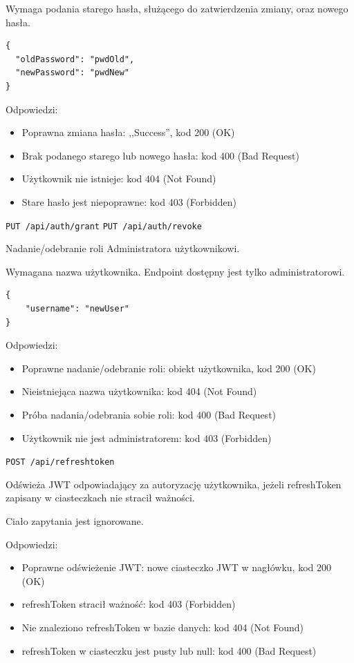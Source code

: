 \documentclass[a4paper,twoside,12pt]{book}
\begin{document}
Wymaga podania starego hasła, służącego do zatwierdzenia zmiany, oraz nowego hasła.

\begin{verbatim}
{
  "oldPassword": "pwdOld",
  "newPassword": "pwdNew"
}
\end{verbatim}

Odpowiedzi: 
\begin{itemize}
	\item Poprawna zmiana hasła: ,,Success'', kod 200 (OK)
	\item Brak podanego starego lub nowego hasła: kod 400 (Bad Request) 
	\item Użytkownik nie istnieje: kod 404 (Not Found) 
	\item Stare hasło jest niepoprawne: kod 403 (Forbidden)
\end{itemize}


\label{grantrevoke-admin-privilege}

\texttt{PUT\ /api/auth/grant} \texttt{PUT\ /api/auth/revoke}

Nadanie/odebranie roli Administratora użytkownikowi.

Wymagana nazwa użytkownika. Endpoint dostępny jest tylko administratorowi.

\begin{verbatim}
{
    "username": "newUser"
}
\end{verbatim}

Odpowiedzi: 
\begin{itemize}
	\item Poprawne nadanie/odebranie roli: obiekt użytkownika, kod 200 (OK) 
	\item Nieistniejąca nazwa użytkownika: kod 404 (Not Found) 
	\item Próba nadania/odebrania sobie roli: kod 400 (Bad Request) 
	\item Użytkownik nie jest administratorem: kod 403 (Forbidden)
\end{itemize}


\label{refresh-token}

\texttt{POST\ /api/refreshtoken}

Odświeża JWT odpowiadający za autoryzację użytkownika, jeżeli refreshToken zapisany w ciasteczkach nie stracił ważności.

Ciało zapytania jest ignorowane.

Odpowiedzi: 
\begin{itemize}
	\item Poprawne odświeżenie JWT: nowe ciasteczko JWT w nagłówku, kod 200 (OK) 
	\item refreshToken stracił ważność: kod 403 (Forbidden) 
	\item Nie znaleziono refreshToken w bazie danych: kod 404 (Not Found)
	\item refreshToken w ciasteczku jest pusty lub null: kod 400 (Bad Request)
\end{itemize}
\end{document}
